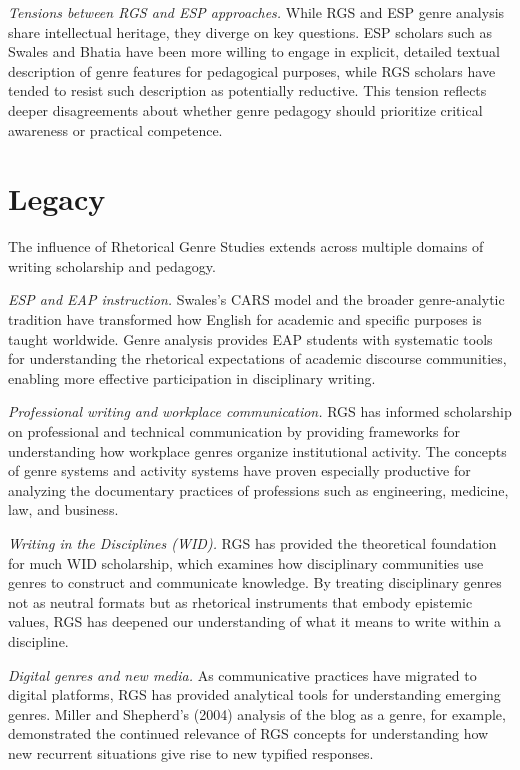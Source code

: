 \documentclass[12pt]{article}
\begin{document}
\textit{Tensions between RGS and ESP approaches.} While RGS and ESP genre analysis share intellectual heritage, they diverge on key questions. ESP scholars such as Swales and Bhatia have been more willing to engage in explicit, detailed textual description of genre features for pedagogical purposes, while RGS scholars have tended to resist such description as potentially reductive. This tension reflects deeper disagreements about whether genre pedagogy should prioritize critical awareness or practical competence.

\section{Legacy}

The influence of Rhetorical Genre Studies extends across multiple domains of writing scholarship and pedagogy.

\textit{ESP and EAP instruction.} Swales's CARS model and the broader genre-analytic tradition have transformed how English for academic and specific purposes is taught worldwide. Genre analysis provides EAP students with systematic tools for understanding the rhetorical expectations of academic discourse communities, enabling more effective participation in disciplinary writing.

\textit{Professional writing and workplace communication.} RGS has informed scholarship on professional and technical communication by providing frameworks for understanding how workplace genres organize institutional activity. The concepts of genre systems and activity systems have proven especially productive for analyzing the documentary practices of professions such as engineering, medicine, law, and business.

\textit{Writing in the Disciplines (WID).} RGS has provided the theoretical foundation for much WID scholarship, which examines how disciplinary communities use genres to construct and communicate knowledge. By treating disciplinary genres not as neutral formats but as rhetorical instruments that embody epistemic values, RGS has deepened our understanding of what it means to write within a discipline.

\textit{Digital genres and new media.} As communicative practices have migrated to digital platforms, RGS has provided analytical tools for understanding emerging genres. Miller and Shepherd's (2004) analysis of the blog as a genre, for example, demonstrated the continued relevance of RGS concepts for understanding how new recurrent situations give rise to new typified responses.
\end{document}

